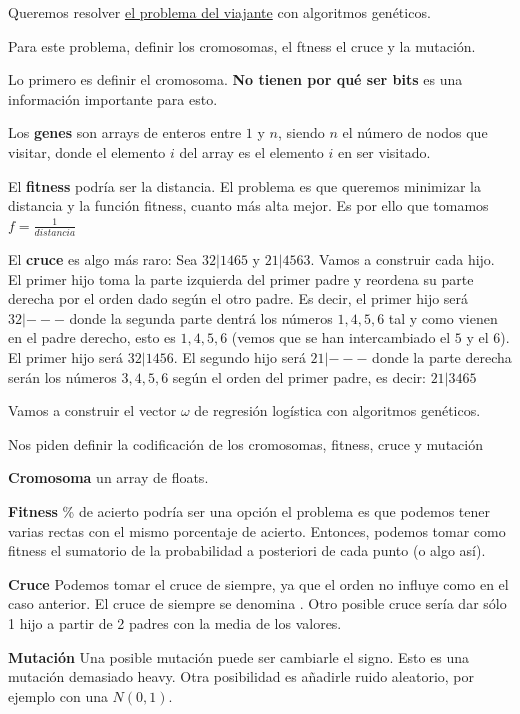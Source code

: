 \documentclass{apuntes}
\begin{document}
\begin{problem}

Queremos resolver \href{https://es.wikipedia.org/wiki/Problema_del_viajante}{el problema del viajante} con algoritmos genéticos.


Para este problema, definir los cromosomas, el ftness el cruce y la mutación.

\solution
Lo primero es definir el cromosoma. \textbf{No tienen por qué ser bits} es una información importante para esto.

Los \textbf{genes} son arrays de enteros entre $1$ y $n$, siendo $n$ el número de nodos que visitar, donde el elemento $i$ del array es el elemento $i$ en ser visitado.

El \textbf{fitness} podría ser la distancia. El problema es que queremos minimizar la distancia y la función fitness, cuanto más alta mejor. Es por ello que tomamos $f = \frac{1}{distancia}$

El \textbf{cruce} es algo más raro: Sea $32|1465$ y $21|4563$. Vamos a construir cada hijo. El primer hijo toma la parte izquierda del primer padre y reordena su parte derecha por el orden dado según el otro padre. Es decir, el primer hijo será $32|---$ donde la segunda parte dentrá los números $1,4,5,6$ tal y como vienen en el padre derecho, esto es $1,4,5,6$ (vemos que se han intercambiado el $5$ y el $6$). El primer hijo será $32|1456$. El segundo hijo será $21|---$ donde la parte derecha serán los números $3,4,5,6$ según el orden del primer padre, es decir: $21|3465$

\end{problem}

\begin{problem}
Vamos a construir el vector $ω$ de regresión logística con algoritmos genéticos.

Nos piden definir la codificación de los cromosomas, fitness, cruce y mutación

\solution

\textbf{Cromosoma} un array de floats.

\textbf{Fitness} \% de acierto podría ser una opción el problema es que podemos tener varias rectas con el mismo porcentaje de acierto. Entonces, podemos tomar como fitness el sumatorio de la probabilidad a posteriori de cada punto (o algo así).

\textbf{Cruce} Podemos tomar el cruce de siempre, ya que el orden no influye como en el caso anterior. El cruce de siempre se denomina . Otro posible cruce sería dar sólo 1 hijo a partir de 2 padres con la media de los valores.

\textbf{Mutación} Una posible mutación puede ser cambiarle el signo. Esto es una mutación demasiado heavy. Otra posibilidad es añadirle ruido aleatorio, por ejemplo con una $N(0,1)$.

\end{problem}
\end{document}

